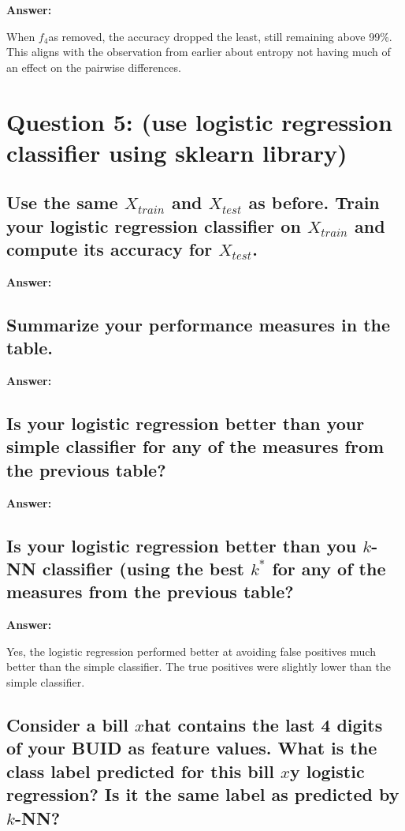 \documentclass[12pt, a4paper]{extarticle}
\newcommand{\answer}[1]{\textbf{Answer: }\par#1}
\newcommand{\knn}{\texorpdfstring{$k$-NN}}
\newcommand{\xtest}{\texorpdfstring{$X_{test}$}}
\newcommand{\xtrain}{\texorpdfstring{$X_{train}$}}
\newcommand{\var}[1]{\texorpdfstring{#1}\xspace}
\newcommand{\fixture}[1]{\texorpdfstring{\ensuremath{f_{#1}}}\xspace}
\begin{document}
    \answer{When \fixture{4} was removed, the accuracy dropped the least, still remaining above 99\%. This aligns with the observation from earlier about entropy not having much of an effect on the pairwise differences.}


    \section{Question 5:  {\normalfont\normalsize{(use logistic regression classifier using sklearn library)}}} \label{sec:question5}

    \subsection{Use the same \xtrain{} and \xtest{} as before. Train your logistic regression classifier on \xtrain{} and compute its accuracy for \xtest{}.} \label{subsec:question5.1}

    \answer{}

    \subsection{Summarize your performance measures in the table.} \label{subsec:question5.2}

    \answer{}

    \subsection{Is your logistic regression better than your simple classifier for any of the measures from the previous table?} \label{subsec:question5.3}

    \answer{}

    \subsection{Is your logistic regression better than you \knn{} classifier (using the best \var{$k^*$}) for any of the measures from the previous table?} \label{subsec:question5.4}

    \answer{Yes, the logistic regression performed better at avoiding false positives much better than the simple classifier. The true positives were slightly lower than the simple classifier.}

    \subsection{Consider a bill \var{$x$} that contains the last 4 digits of your BUID as feature values. What is the class label predicted for this bill \var{$x$} by logistic regression? Is it the same label as predicted by \knn{}?} \label{subsec:question5.5}
\end{document}
